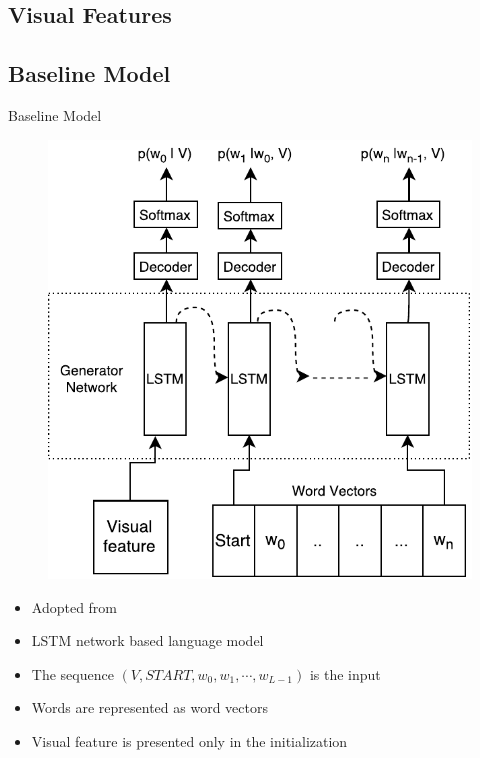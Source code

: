 \documentclass{beamer}
\begin{document}
\subsection{Visual Features}
\subsection{Baseline Model}
\begin{frame}{Baseline Model}
    \begin{figure}[h]
        \centering
        \includegraphics[width=0.4\linewidth]{images/Thesis_lstmLangGen.pdf}
    \end{figure}
    \begin{itemize}
        \item Adopted from~\cite{Vinyals_2015_CVPR} 
        \item LSTM network based language model
        \item The sequence $(V,START,w_0, w_1, \cdots,w_{L-1})$ is the input
        \item Words are represented as word vectors 
        \item Visual feature is presented only in the initialization 
    \end{itemize}
\end{frame}
\end{document}
